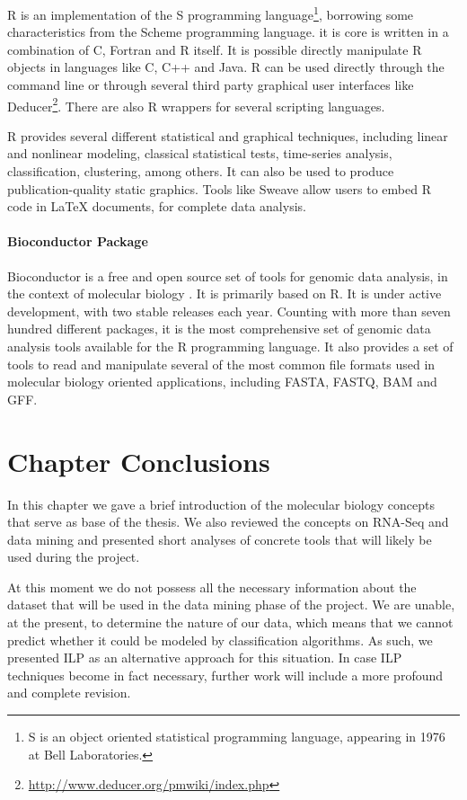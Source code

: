 R is an implementation of the S programming language\footnote{S is an object
oriented statistical programming language, appearing in 1976 at Bell
Laboratories.}, borrowing some characteristics from the Scheme programming
language. it is core is written in a combination of C, Fortran and R itself. It
is possible directly manipulate R objects in languages like C, C++ and Java. R
can be used directly through the command line or through several third party
graphical user interfaces like
Deducer\footnote{\url{http://www.deducer.org/pmwiki/index.php}}. There are also
R wrappers for several scripting languages.

R provides several different statistical and graphical techniques, including
linear and nonlinear modeling, classical statistical tests, time-series
analysis, classification, clustering, among others. It can also be used to
produce publication-quality static graphics. Tools like Sweave
\cite{lmucs-papers:Leisch:2002} allow users to embed R code in \LaTeX{}
documents, for complete data analysis.

\paragraph{Bioconductor Package}

Bioconductor is a free and open source set of tools for genomic data analysis,
in the context of molecular biology \cite{lmucs-papers:Leisch:2002}. It is
primarily based on R. It is under active development, with two stable releases
each year. Counting with more than seven hundred different packages, it is the
most comprehensive set of genomic data analysis tools available for the R
programming language. It also provides a set of tools to read and manipulate
several of the most common file formats used in molecular biology oriented
applications, including FASTA, FASTQ, BAM and GFF.

\section{Chapter Conclusions}

In this chapter we gave a brief introduction of the molecular biology concepts
that serve as base of the thesis. We also reviewed the concepts on RNA-Seq and
data mining and presented short analyses of concrete tools that will likely be
used during the project.

At this moment we do not possess all the necessary information about the dataset
that will be used in the data mining phase of the project. We are unable, at the
present, to determine the nature of our data, which means that we cannot predict
whether it could be modeled by classification algorithms. As such, we presented
ILP as an alternative approach for this situation. In case ILP techniques become
in fact necessary, further work will include a more profound and complete
revision.
